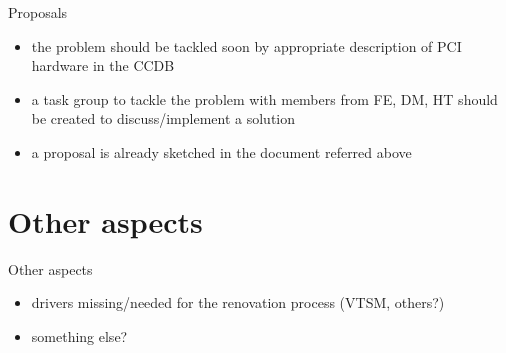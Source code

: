 \documentclass[compress,red]{beamer}
\begin{document}
\begin{frame}{Proposals}
\begin{itemize}
\item the problem should be tackled soon by appropriate description
	of PCI hardware in the CCDB
\item a task group to tackle the problem with members from
	FE, DM, HT should be created to discuss/implement a solution
\item a proposal is already sketched in the document referred above
\end{itemize}
\end{frame}

\section{Other aspects}

\begin{frame}{Other aspects}
\begin{itemize}
\item drivers missing/needed for the renovation process (VTSM, others?)
\item something else?
\end{itemize}
\end{frame}
\end{document}
